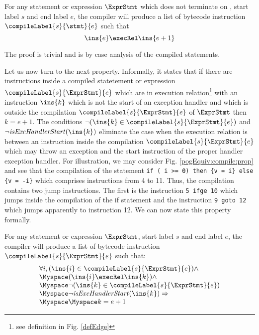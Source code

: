 \begin{compProp0}\label{compile:prop:compProp0}
 For any statement or expression $\ExprStmt$ which does not terminate on \return, start label $s$ and end label $e$,
    the compiler will produce a list of bytecode instruction $\compileLabel{s}{\stmt}{e}$ such that 
     $$ \ins{e} \execRel \ins{e+1}$$
\end{compProp0}
The proof is trivial and is by case analysis of the compiled statements.

Let us now turn to the next property. Informally, it states  that  if there are instructions inside a compiled statetement or expression 
 $\compileLabel{s}{\ExprStmt}{e}$ which are in execution relation\footnote{see definition in Fig. \ref{defEdge}}  with an instruction 
$\ins{k}$ which is not the start of an exception handler and which is outside the compilation $\compileLabel{s}{\ExprStmt }{e}$
of $\ExprStmt$ 
 then   $ k  = e +1$. 
 The conditions  $ \neg (\ins{k} \in  \compileLabel{s}{\ExprStmt}{e} )  $ and 
$\neg \isStartExc{\ins{k}}$  eliminate the case when the execution relation is between an instruction inside 
the compilation $\compileLabel{s}{\ExprStmt}{e}$ which may throw an exception and the start instruction of the proper handler exception handler.
For illustration, we may consider Fig. \ref{pogEquiv:compile:prop} and see that the compilation of the statement  
\lstinline!if ( i >= 0) then {v = i} else {v = -i}! 
which comprises instructions from 4 to 11. 
Thus, the compilation contains two jump instructions. The first is the instruction \lstinline!5 ifge 10! which jumps inside the compilation of the if statement
and the instruction \lstinline!9 goto 12!  which jumps apparently to instruction 12. 
We can now state this property formally.

\begin{compProp1}\label{compile:prop:compProp1}
    For any statement or expression $\ExprStmt$, start label $s$ and end label $e$,
    the compiler will produce a list of bytecode instruction $\compileLabel{s}{\ExprStmt}{e}$ such that: 
           $$ \begin{array}{l} 
                             \forall i, ( \ins{i} \in \compileLabel{s}{\ExprStmt }{e} ) \wedge \\
			     \Myspace ( \ins{i} \execRel \ins{k}) \wedge \\
			     \Myspace \neg (\ins{k} \in   \compileLabel{s}{\ExprStmt}{e}  ) \\
			     \Myspace \neg \isStartExc{\ins{k}}     \Rightarrow   \\
                             \Myspace \Myspace k = e + 1  \\
			     
              \end{array}$$ 
\end{compProp1}



